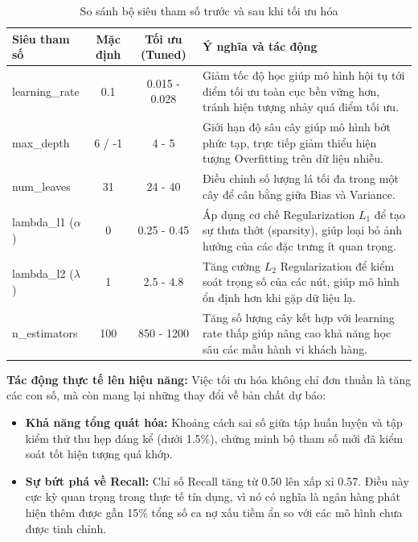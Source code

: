 \begin{table}[H]
    \centering
    \caption{So sánh bộ siêu tham số trước và sau khi tối ưu hóa}
    \label{tab:params}
    \begin{tabular}{|l|c|c|p{6.5cm}|}
        \hline
        \rowcolor{Gray}
        \textbf{Siêu tham số} & \textbf{Mặc định} & \textbf{Tối ưu (Tuned)} & \textbf{Ý nghĩa và tác động} \\ \hline
        learning\_rate & 0.1 & 0.015 - 0.028 & Giảm tốc độ học giúp mô hình hội tụ tới điểm tối ưu toàn cục bền vững hơn, tránh hiện tượng nhảy quá điểm tối ưu. \\ \hline
        max\_depth & 6 / -1 & 4 - 5 & Giới hạn độ sâu cây giúp mô hình bớt phức tạp, trực tiếp giảm thiểu hiện tượng Overfitting trên dữ liệu nhiễu. \\ \hline
        num\_leaves & 31 & 24 - 40 & Điều chỉnh số lượng lá tối đa trong một cây để cân bằng giữa Bias và Variance. \\ \hline
        lambda\_l1 ($\alpha$) & 0 & 0.25 - 0.45 & Áp dụng cơ chế Regularization $L_1$ để tạo sự thưa thớt (sparsity), giúp loại bỏ ảnh hưởng của các đặc trưng ít quan trọng. \\ \hline
        lambda\_l2 ($\lambda$) & 1 & 2.5 - 4.8 & Tăng cường $L_2$ Regularization để kiểm soát trọng số của các nút, giúp mô hình ổn định hơn khi gặp dữ liệu lạ. \\ \hline
        n\_estimators & 100 & 850 - 1200 & Tăng số lượng cây kết hợp với learning rate thấp giúp nâng cao khả năng học sâu các mẫu hành vi khách hàng. \\ \hline
    \end{tabular}
\end{table}

\textbf{Tác động thực tế lên hiệu năng:}
Việc tối ưu hóa không chỉ đơn thuần là tăng các con số, mà còn mang lại những thay đổi về bản chất dự báo:
\begin{itemize}
    \item \textbf{Khả năng tổng quát hóa:} Khoảng cách sai số giữa tập huấn luyện và tập kiểm thử thu hẹp đáng kể (dưới 1.5\%), chứng minh bộ tham số mới đã kiểm soát tốt hiện tượng quá khớp.
    \item \textbf{Sự bứt phá về Recall:} Chỉ số Recall tăng từ 0.50 lên xấp xỉ 0.57. Điều này cực kỳ quan trọng trong thực tế tín dụng, vì nó có nghĩa là ngân hàng phát hiện thêm được gần 15\% tổng số ca nợ xấu tiềm ẩn so với các mô hình chưa được tinh chỉnh.
\end{itemize}

